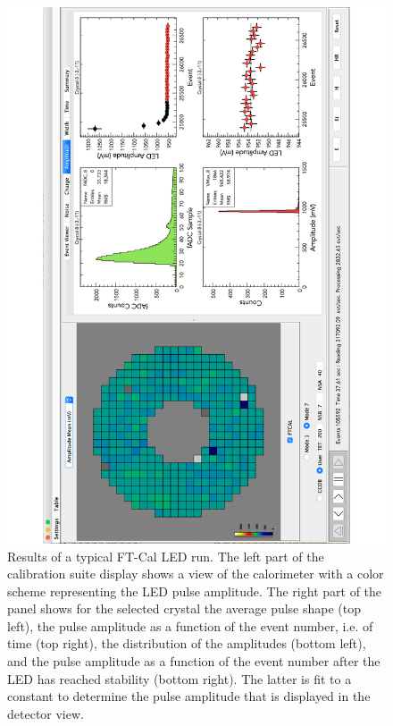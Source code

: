 \begin{figure}
\includegraphics[height=1.0\columnwidth,angle=270]{fig/ftcal_ledrun.pdf}
\caption{Results of a typical FT-Cal LED run. The left part of the calibration suite display shows a view of the
  calorimeter with a color scheme representing the LED pulse amplitude. The right part of the panel shows for the
  selected crystal the average pulse shape (top left), the pulse amplitude as a function of the event number, i.e. of
  time (top right), the distribution of the amplitudes (bottom left), and the pulse amplitude as a function of the
  event number after the LED has reached stability (bottom right). The latter is fit to a constant to determine the pulse
  amplitude that is displayed in the detector view.}
\label{fig:ftcal_ledrun}
\end{figure}


